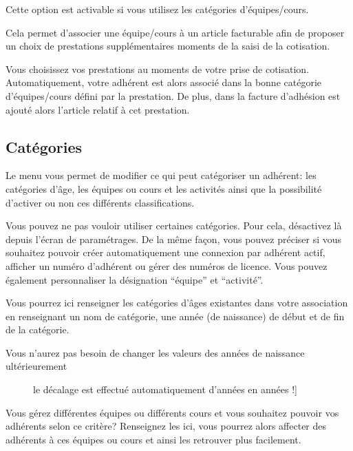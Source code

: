 \documentclass[a4paper,10pt,oneside,french]{sphinxmanual}
\begin{document}

Cette option est activable si vous utilisez les catégories d’équipes/cours.

Cela permet d’associer une équipe/cours à un article facturable afin de proposer un choix de prestations supplémentaires moments de la saisi de la cotisation.

Vous choisissez vos prestations au moments de votre prise de cotisation.
Automatiquement, votre adhérent est alors associé dans la bonne catégorie d’équipes/cours défini par la prestation.
De plus, dans la facture d’adhésion est ajouté alors l’article relatif à cet prestation.


\subsection{Catégories}
\label{\detokenize{member/config:categories}}
Le menu  vous permet de modifier ce qui peut catégoriser un adhérent: les catégories d’âge, les équipes ou cours et les activités ainsi que la possibilité d’activer ou non ces différents classifications.

Vous pouvez ne pas vouloir utiliser certaines catégories. Pour cela, désactivez là depuis l’écran de paramétrages.
De la même façon, vous pouvez préciser si vous souhaitez pouvoir créer automatiquement une connexion par adhérent actif, afficher un numéro d’adhérent ou gérer des numéros de licence.
Vous pouvez également personnaliser la désignation “équipe” et “activité”.
\begin{quote}

\noindent{}
\end{quote}


Vous pourrez ici renseigner les catégories d’âges existantes dans votre association en renseignant un nom de catégorie, une année (de naissance) de début et de fin de la catégorie.
\begin{description}
\item[{Vous n’aurez pas besoin de changer les valeurs des années de naissance ultérieurement}] \leavevmode{[}le décalage est effectué automatiquement d’années en années !{]}
\noindent{}

\end{description}

\begin{description}
\item[{Vous gérez différentes équipes ou différents cours et vous souhaitez pouvoir vos adhérents selon ce critère? Renseignez les ici, vous pourrez alors affecter des adhérents à ces équipes ou cours et ainsi les retrouver plus facilement.}] \leavevmode
\noindent{}

\end{description}
\end{document}
